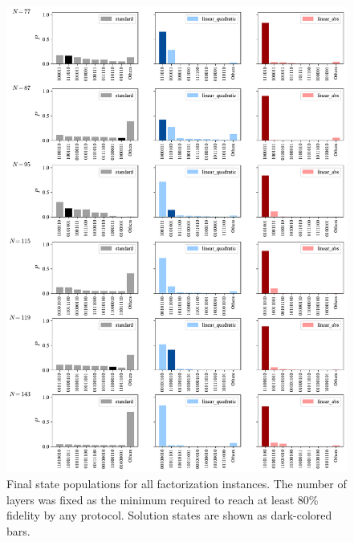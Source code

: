 \begin{figure}[h]
    \centering
    \includegraphics[width=1\textwidth]{06-appendix/figs/populations_all2.pdf}
    \caption{Final state populations for all factorization instances. The number
    of layers was fixed as the minimum required to reach at least 80\% fidelity by any
    protocol. Solution states are shown as dark-colored bars.}
    \label{fig:populations_all}
\end{figure}